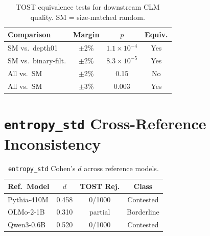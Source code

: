 \documentclass[11pt,a4paper]{article}
\begin{document}
\begin{table}[h]
\centering
\small
\begin{tabular}{lccc}
\toprule
\textbf{Comparison} & \textbf{Margin} & \textbf{$p$} & \textbf{Equiv.} \\
\midrule
SM vs.\ depth01 & $\pm$2\% & $1.1 \times 10^{-4}$ & Yes \\
SM vs.\ binary-filt. & $\pm$2\% & $8.3 \times 10^{-5}$ & Yes \\
All vs.\ SM & $\pm$2\% & 0.15 & No \\
All vs.\ SM & $\pm$3\% & 0.003 & Yes \\
\bottomrule
\end{tabular}
\caption{TOST equivalence tests for downstream CLM quality. SM = size-matched random.}
\label{tab:tost_downstream}
\end{table}

\section{\texttt{entropy\_std} Cross-Reference Inconsistency}
\label{app:entropy_std}

\begin{table}[h]
\centering
\small
\begin{tabular}{lccc}
\toprule
\textbf{Ref.\ Model} & \textbf{$d$} & \textbf{TOST Rej.} & \textbf{Class} \\
\midrule
Pythia-410M & 0.458 & 0/1000 & Contested \\
OLMo-2-1B & 0.310 & partial & Borderline \\
Qwen3-0.6B & 0.520 & 0/1000 & Contested \\
\bottomrule
\end{tabular}
\caption{\texttt{entropy\_std} Cohen's $d$ across reference models.}
\label{tab:entropy_std_cross}
\end{table}
\end{document}
